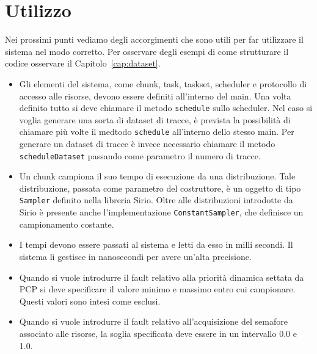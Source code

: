 \section{Utilizzo}
Nei prossimi punti vediamo degli accorgimenti che sono utili per far utilizzare il sistema nel modo corretto. Per osservare degli esempi di come strutturare il codice osservare il Capitolo~\ref{cap:dataset}.
\begin{itemize}
    \item Gli elementi del sistema, come chunk, task, taskset, scheduler e protocollo di accesso alle risorse, devono essere definiti all'interno del main. Una volta definito tutto si deve chiamare il metodo \texttt{schedule} sullo scheduler. Nel caso si voglia generare una sorta di dataset di tracce, è prevista la possibilità di chiamare più volte il medtodo \texttt{schedule} all'interno dello stesso main. Per generare un dataset di tracce è invece necessario chiamare il metodo \texttt{scheduleDataset} passando come parametro il numero di tracce.
    \item Un chunk campiona il suo tempo di esecuzione da una distribuzione. Tale distribuzione, passata come parametro del costruttore, è un oggetto di tipo \texttt{Sampler} definito nella libreria Sirio. Oltre alle distribuzioni introdotte da Sirio è presente anche l'implementazione \texttt{ConstantSampler}, che definisce un campionamento costante.
    \item I tempi devono essere passati al sistema e letti da esso in milli secondi. Il sistema li gestisce in nanosecondi per avere un'alta precisione.
    \item Quando si vuole introdurre il fault relativo alla priorità dinamica settata da PCP si deve specificare il valore minimo e massimo entro cui campionare. Questi valori sono intesi come esclusi.
    \item Quando si vuole introdurre il fault relativo all'acquisizione del semafore associato alle risorse, la soglia specificata deve essere in un intervallo 0.0 e 1.0.
\end{itemize}